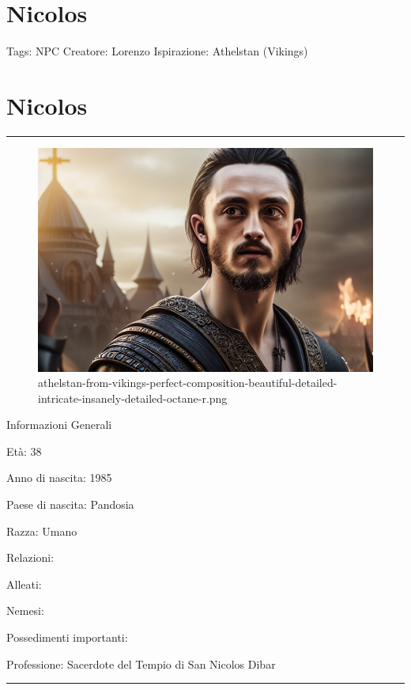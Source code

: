 \section{Nicolos}\label{nicolos}

Tags: NPC Creatore: Lorenzo Ispirazione: Athelstan (Vikings)

\section{Nicolos}\label{nicolos-1}

\begin{center}\rule{0.5\linewidth}{0.5pt}\end{center}

\begin{figure}
\centering
\includegraphics{athelstan-from-vikings-perfect-composition-beautiful-detailed-intricate-insanely-detailed-octane-r.png}
\caption{athelstan-from-vikings-perfect-composition-beautiful-detailed-intricate-insanely-detailed-octane-r.png}
\end{figure}

Informazioni Generali

Età: 38

Anno di nascita: 1985

Paese di nascita: Pandosia

Razza: Umano

Relazioni:

Alleati:

Nemesi:

Possedimenti importanti:

Professione: Sacerdote del Tempio di San Nicolos Dibar

\begin{center}\rule{0.5\linewidth}{0.5pt}\end{center}

